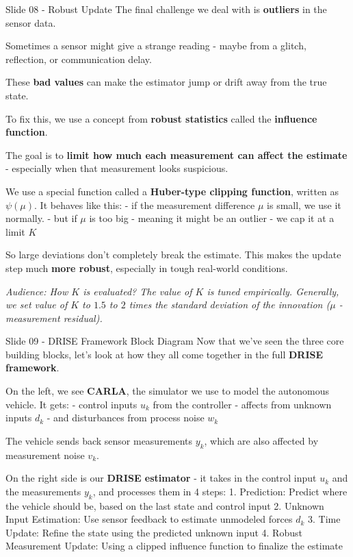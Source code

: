 \documentclass{beamer}
\begin{document}
\begin{frame}{Slide 08 - Robust Update}
\protect\hypertarget{slide-08---robust-update}{}
The final challenge we deal with is \textbf{outliers} in the sensor
data.

Sometimes a sensor might give a strange reading - maybe from a glitch,
reflection, or communication delay.

These \textbf{bad values} can make the estimator jump or drift away from
the true state.

To fix this, we use a concept from \textbf{robust statistics} called the
\textbf{influence function}.

The goal is to \textbf{limit how much each measurement can affect the
estimate} - especially when that measurement looks suspicious.

We use a special function called a \textbf{Huber-type clipping
function}, written as \(\psi(\mu)\). It behaves like this: - if the
measurement difference \(\mu\) is small, we use it normally. - but if
\(\mu\) is too big - meaning it might be an outlier - we cap it at a
limit \(K\)

So large deviations don't completely break the estimate. This makes the
update step much \textbf{more robust}, especially in tough real-world
conditions.

\emph{Audience: How \(K\) is evaluated? The value of \(K\) is tuned
empirically. Generally, we set value of \(K\) to \(1.5\) to \(2\) times
the standard deviation of the innovation (\(\mu\) - measurement
residual).}
\end{frame}

\begin{frame}{Slide 09 - DRISE Framework Block Diagram}
\protect\hypertarget{slide-09---drise-framework-block-diagram}{}
Now that we've seen the three core building blocks, let's look at how
they all come together in the full \textbf{DRISE framework}.

On the left, we see \textbf{CARLA}, the simulator we use to model the
autonomous vehicle. It gets: - control inputs \(u_k\) from the
controller - affects from unknown inputs \(d_k\) - and disturbances from
process noise \(w_k\)

The vehicle sends back sensor measurements \(y_k\), which are also
affected by measurement noise \(v_k\).

On the right side is our \textbf{DRISE estimator} - it takes in the
control input \(u_k\) and the measurements \(y_k\), and processes them
in 4 steps: 1. Prediction: Predict where the vehicle should be, based on
the last state and control input 2. Unknown Input Estimation: Use sensor
feedback to estimate unmodeled forces \(d_k\) 3. Time Update: Refine the
state using the predicted unknown input 4. Robust Measurement Update:
Using a clipped influence function to finalize the estimate
\end{frame}
\end{document}
